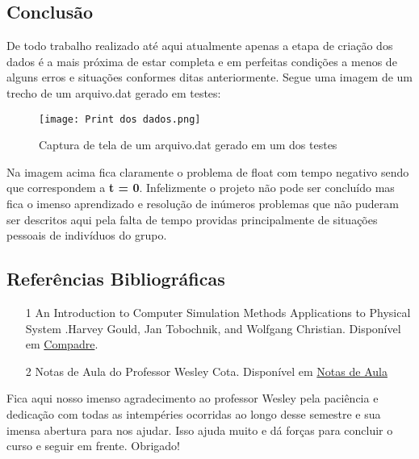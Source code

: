 \documentclass{article}
\begin{document}
\subsection{Conclusão}
De todo trabalho realizado até aqui atualmente apenas a etapa de criação dos dados é a mais próxima de estar completa e em perfeitas condições a menos de alguns erros e situações conformes ditas anteriormente. Segue uma imagem de um trecho de um arquivo.dat gerado em testes:
\begin{figure}[H]
    \centering
    \texttt{[image: Print dos dados.png]}
    \captionsetup{labelformat=empty}
    \caption{Captura de tela de um arquivo.dat gerado em um dos testes}
    \label{fig:enter-label}
\end{figure}
Na imagem acima fica claramente o problema de float com tempo negativo sendo que correspondem a \textbf{t = 0}.
Infelizmente o projeto não pode ser concluído mas fica o imenso aprendizado e resolução de inúmeros problemas que não puderam ser descritos aqui pela falta de tempo providas principalmente de situações pessoais de indivíduos do grupo.
\subsection{Referências Bibliográficas}
\begin{itemize}
    \item [1] An Introduction to Computer Simulation Methods Applications to Physical System .Harvey Gould, Jan Tobochnik, and Wolfgang Christian. Disponível em \href{https://www.compadre.org/osp/items/detail.cfm?ID=7375}{Compadre}.
    \item [2] Notas de Aula do Professor Wesley Cota. Disponível em \href{https://fis492.wcota.me/}{Notas de Aula}
\end{itemize}
Fica aqui nosso imenso agradecimento ao professor Wesley pela paciência e dedicação com todas as intempéries ocorridas ao longo desse semestre e sua imensa abertura para nos ajudar. Isso ajuda muito e dá forças para concluir o curso e seguir em frente. Obrigado!
\end{document}
